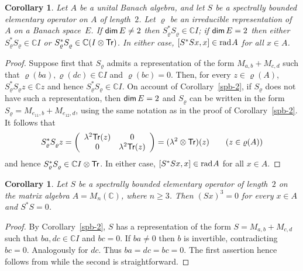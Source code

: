 \documentclass[a4paper,12pt,reqno]{amsart}
\numberwithin{equation}{section}
\newtheorem{cor}[thm]{Corollary}
\theoremstyle{definition}
\begin{document}
\begin{cor}\label{Gspb-2}
Let $A$ be a unital Banach algebra, and let $S$ be a spectrally bounded elementary operator on $A$ of length~$2$.
Let $\varrho$ be an irreducible representation of $A$ on a Banach space~$E$.
If ${{\sf dim}\,} E\ne2$ then $S^*_\varrho S^{}_\varrho\in{\mathbb{C}} I$; if ${{\sf dim}\,} E=2$ then either $S^*_\varrho S^{}_\varrho\in{\mathbb{C}} I$
or $S^*_\varrho S^{}_\varrho\in{\mathbb{C}}(I\otimes{{\sf Tr}})$.
In either case, $[{S}^* {S} x, x]\in {{\textup{rad}\kern.7pt A}}$ for all $x \in A$.
\end{cor}
\begin{proof}
Suppose first that $S_\varrho$ admits a representation of the form $M_{a,b}+M_{c,d}$ such that $\varrho(ba),\varrho(dc)\in{\mathbb{C}} I$ and $\varrho(bc)=0$.
Then, for every $z\in\varrho(A)$, $S_\varrho^*S^{}_\varrho z\in{\mathbb{C}} z$ and hence $S_\varrho^*S^{}_\varrho\in{\mathbb{C}} I$.
On account of Corollary~\ref{spb-2}, if $S_\varrho$ does not have such a representation, then ${{\sf dim}\,} E=2$
and $S_\varrho$ can be written in the form $S_\varrho=M_{e_{11},b}+M_{e_{12},d}$, using the same notation
as in the proof of Corollary~\ref{spb-2}. It follows that
\begin{equation*}
S^*_{\varrho} S^{}_{\varrho} z= \left(\begin{array}{cc}
                                                                                \lambda^2 {{\sf Tr}}(z) & 0 \\
                                                                                0 & \lambda^2 {{\sf Tr}}(z) \\
                                                                                \end{array}\right)
                                                                = (\lambda^2\otimes{{\sf Tr}})(z)\qquad(z\in\varrho(A))
\end{equation*}
and hence $S^*_{\varrho} S^{}_{\varrho}\in{\mathbb{C}} I\otimes{{\sf Tr}}$. In either case, $[{S}^* {S} x, x]\in {{\textup{rad}\kern.7pt A}}$ for all $x \in A$.
\end{proof}
\begin{cor}\label{spb-2-matrix}
Let ${S}$ be a spectrally bounded  elementary operator of length~$2$ on the matrix algebra $A=M_n ({\mathbb{C}})$,
where $n\geq 3$. Then $(Sx)^3=0$ for every $x \in A$  and ${S}^* {S} =0$.
\end{cor}
\begin{proof}
By Corollary~\ref{spb-2}, $S$ has a representation of the form $S=M_{a,b}+M_{c,d}$ such that $ba, dc \in{\mathbb{C}} I$ and $bc=0$.
If $ba\neq 0$ then $b$ is invertible, contradicting $bc=0$. Analogously for $dc$. Thus $ba=dc=bc=0$.
The first assertion hence follows from \cite[Corollary~2.5]{NaMa13} while the second is straightforward.
\end{proof}
\end{document}
